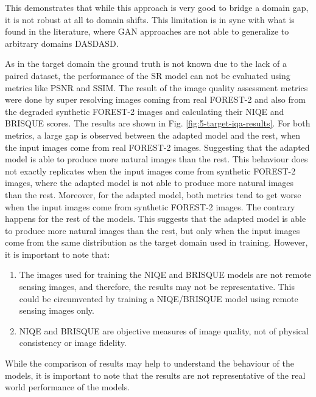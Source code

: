         
        
    This demonstrates that while this approach is very good to bridge a domain gap, it is not robust at all to domain shifts. 
    This limitation is in sync with what is found in the literature, where GAN approaches are not able to generalize to arbitrary domains DASDASD.


    As in the target domain the ground truth is not known due to the lack of a paired dataset, the performance of the SR model can not be evaluated using metrics like PSNR and SSIM.
    The result of the image quality assessment metrics were done by super resolving images coming from real FOREST-2 and also from the degraded synthetic FOREST-2 images and calculating their NIQE and BRISQUE scores.
    The results are shown in Fig. \ref{fig:5-target-iqa-results}.
    For both metrics, a large gap is observed between the adapted model and the rest, when the input images come from real FOREST-2 images. 
    Suggesting that the adapted model is able to produce more natural images than the rest.
    This behaviour does not exactly replicates when the input images come from synthetic FOREST-2 images, where the adapted model is not able to produce more natural images than the rest.
    Moreover, for the adapted model, both metrics tend to get worse when the input images come from synthetic FOREST-2 images. The contrary happens for the rest of the models.
    This suggests that the adapted model is able to produce more natural images than the rest, but only when the input images come from the same distribution as the target domain used in training.
    However, it is important to note that: 

    \begin{enumerate}
        \item The images used for training the NIQE and BRISQUE models are not remote sensing images, and therefore, the results may not be representative. This could be circumvented by training a NIQE/BRISQUE model using remote sensing images only.
        \item NIQE and BRISQUE are objective measures of image quality, not of physical consistency or image fidelity.
    \end{enumerate}

    While the comparison of results may help to understand the behaviour of the models, it is important to note that the results are not representative of the real world performance of the models. 


